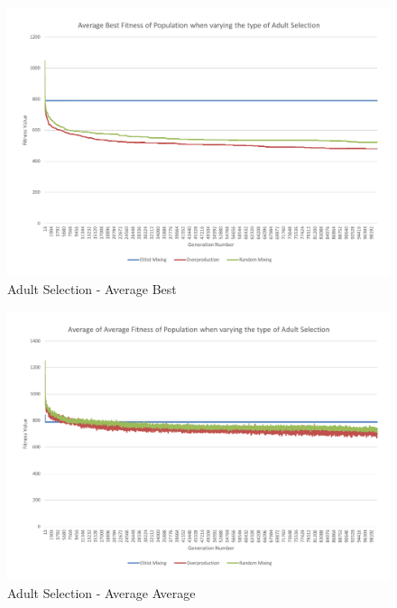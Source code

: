 \begin{figure}[thbp]
	\centerline{\includegraphics[width=\paperwidth]{figures/CircleTests/CircleTestAdultSelectionAverageBest.pdf}}
	\caption{Adult Selection - Average Best}
\end{figure}

\begin{figure}[thbp]
	\centerline{\includegraphics[width=\paperwidth]{figures/CircleTests/CircleTestAdultSelectionAverageAverage.pdf}}
	\caption{Adult Selection - Average Average}
\end{figure}

